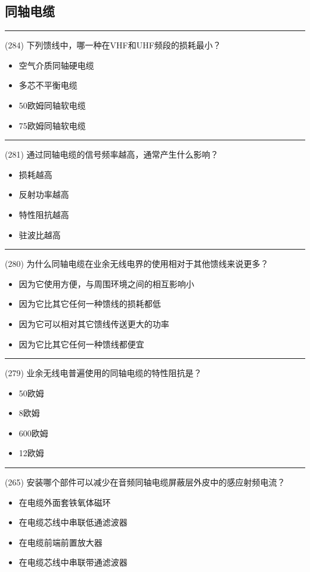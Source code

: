 \documentclass[twocolumn,hyperref,UTF8]{ctexart}  %
\begin{document}
\clearpage
\subsection{同轴电缆}


\noindent\rule{0.5\textwidth}{1pt}
\heiti (284) 下列馈线中，哪一种在VHF和UHF频段的损耗最小？ \songti {\color{gray} [LK1224] }
\begin{itemize}
	\item  空气介质同轴硬电缆
	\item  多芯不平衡电缆
	\item  50欧姆同轴软电缆
	\item  75欧姆同轴软电缆
\end{itemize}


\noindent\rule{0.5\textwidth}{1pt}
\heiti (281) 通过同轴电缆的信号频率越高，通常产生什么影响？ \songti {\color{gray} [LK1221] }
\begin{itemize}
	\item  {\color{LimeGreen}损耗越高}
	\item  反射功率越高
	\item  特性阻抗越高
	\item  驻波比越高
\end{itemize}


\noindent\rule{0.5\textwidth}{1pt}
\heiti (280) 为什么同轴电缆在业余无线电界的使用相对于其他馈线来说更多？ \songti {\color{gray} [LK1219] }
\begin{itemize}
	\item  因为它使用方便，与周围环境之间的相互影响小
	\item  因为它比其它任何一种馈线的损耗都低
	\item  因为它可以相对其它馈线传送更大的功率
	\item  因为它比其它任何一种馈线都便宜
\end{itemize}


\noindent\rule{0.5\textwidth}{1pt}
\heiti (279) 业余无线电普遍使用的同轴电缆的特性阻抗是？ \songti {\color{gray} [LK1218] }
\begin{itemize}
	\item  50欧姆
	\item  8欧姆
	\item  600欧姆
	\item  12欧姆
\end{itemize}


\noindent\rule{0.5\textwidth}{1pt}
\heiti (265) 安装哪个部件可以减少在音频同轴电缆屏蔽层外皮中的感应射频电流？ \songti {\color{gray} [LK1126] }
\begin{itemize}
	\item  在电缆外面套铁氧体磁环
	\item  在电缆芯线中串联低通滤波器
	\item  在电缆前端前置放大器
	\item  在电缆芯线中串联带通滤波器
\end{itemize}
\end{document}

